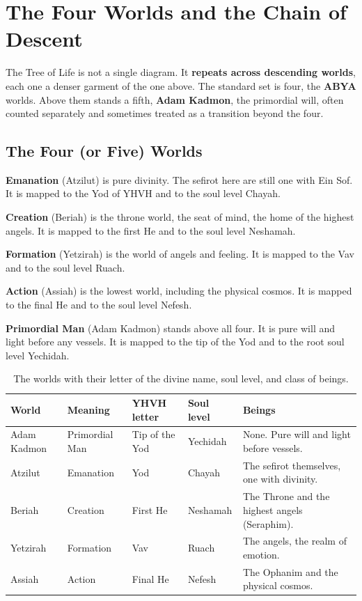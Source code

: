 \section{The Four Worlds and the Chain of Descent}

The Tree of Life is not a single diagram. It \textbf{repeats across descending worlds}, each one a
denser garment of the one above. The standard set is four, the \textbf{ABYA} worlds. Above them stands
a fifth, \textbf{Adam Kadmon}, the primordial will, often counted separately and sometimes treated as a
transition beyond the four.

\subsection{The Four (or Five) Worlds}

\textbf{Emanation} (Atzilut) is pure divinity. The sefirot here are still one with Ein Sof. It is mapped
to the Yod of YHVH and to the soul level Chayah.

\textbf{Creation} (Beriah) is the throne world, the seat of mind, the home of the highest angels. It is
mapped to the first He and to the soul level Neshamah.

\textbf{Formation} (Yetzirah) is the world of angels and feeling. It is mapped to the Vav and to the
soul level Ruach.

\textbf{Action} (Assiah) is the lowest world, including the physical cosmos. It is mapped to the final
He and to the soul level Nefesh.

\textbf{Primordial Man} (Adam Kadmon) stands above all four. It is pure will and light before any
vessels. It is mapped to the tip of the Yod and to the root soul level Yechidah.

\begin{longtable}{l L{2.4cm} l l L{3.6cm}}
\caption{The worlds with their letter of the divine name, soul level, and class of beings.}\\
\toprule
\textbf{World} & \textbf{Meaning} & \textbf{YHVH letter} & \textbf{Soul level} & \textbf{Beings} \\
\midrule
Adam Kadmon & Primordial Man & Tip of the Yod & Yechidah & None. Pure will and light before vessels. \\
Atzilut & Emanation & Yod & Chayah & The sefirot themselves, one with divinity. \\
Beriah & Creation & First He & Neshamah & The Throne and the highest angels (Seraphim). \\
Yetzirah & Formation & Vav & Ruach & The angels, the realm of emotion. \\
Assiah & Action & Final He & Nefesh & The Ophanim and the physical cosmos. \\
\bottomrule
\end{longtable}


